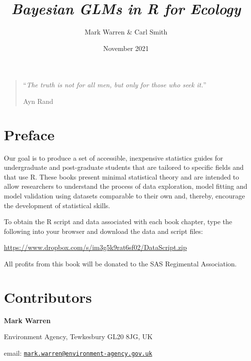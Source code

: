 \documentclass[
]{book}
\title{\emph{Bayesian GLMs in R for Ecology}}
\author{Mark Warren \& Carl Smith}
\date{November 2021}
\begin{document}
\maketitle

{
\setcounter{tocdepth}{2}
\tableofcontents
}
\hypertarget{section}{%
\chapter*{}\label{section}}

\begin{quote}
``\emph{The truth is not for all men, but only for those who seek it.}''

Ayn Rand
\end{quote}

\hypertarget{preface}{%
\chapter*{Preface}\label{preface}}

Our goal is to produce a set of accessible, inexpensive statistics guides for undergraduate and post-graduate students that are tailored to specific fields and that use R. These books present minimal statistical theory and are intended to allow researchers to understand the process of data exploration, model fitting and model validation using datasets comparable to their own and, thereby, encourage the development of statistical skills.

To obtain the R script and data associated with each book chapter, type the following into your browser and download the data and script files:

\url{https://www.dropbox.com/s/im3g5k9rat6sf02/DataScript.zip}

All profits from this book will be donated to the SAS Regimental Association.

\hypertarget{contributors}{%
\chapter*{Contributors}\label{contributors}}

\textbf{Mark Warren}

Environment Agency,
Tewkesbury GL20 8JG,
UK

email: \href{mailto:mark.warren@environment-agency.gov.uk}{\nolinkurl{mark.warren@environment-agency.gov.uk}}
\end{document}
